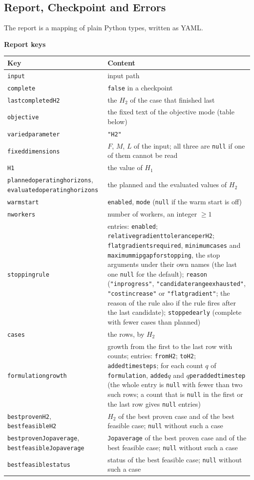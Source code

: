 \documentclass[11pt,a4paper]{article}
\makeatletter
\theoremstyle{plain}
\theoremstyle{definition}
\newcommand{\blockhead}[1]{\par\noindent\textbf{#1}\par\nobreak}
\renewcommand{\_}{\textunderscore\allowbreak{}}
\providecommand{\rejrow}[2]{{\raggedright #1\par} & {\raggedright #2\par} \\}
\providecommand{\tabstart}[2]{\begingroup\small\begin{longtable}{@{}#1@{}}\toprule #2 \\ \midrule \endhead}
\providecommand{\tabend}{\bottomrule\end{longtable}\endgroup}
\makeatother
\begin{document}
\subsection{Report, Checkpoint and Errors}
\label{sec:sweep_report}

The report is a mapping of plain Python types, written as YAML.

\blockhead{Report keys}
\tabstart{p{5.2cm}p{9.8cm}}{Key & Content}
\rejrow{\texttt{input}}{input path}
\rejrow{\texttt{complete}}{\texttt{false} in a checkpoint}
\rejrow{\texttt{last\_completed\_H2}}{the $H_2$ of the case that finished last}
\rejrow{\texttt{objective}}{the fixed text of the objective mode (table below)}
\rejrow{\texttt{varied\_parameter}}{\texttt{"H2"}}
\rejrow{\texttt{fixed\_dimensions}}{$F$, $M$, $L$ of the input; all three are \texttt{null} if one of them cannot be read}
\rejrow{\texttt{H1}}{the value of $H_1$}
\rejrow{\texttt{planned\_operating\_horizons}, \texttt{evaluated\_operating\_horizons}}{the planned and the evaluated values of $H_2$}
\rejrow{\texttt{warm\_start}}{\texttt{enabled}, \texttt{mode} (\texttt{null} if the warm start is off)}
\rejrow{\texttt{n\_workers}}{number of workers, an integer $\ge 1$}
\rejrow{\texttt{stopping\_rule}}{entries: \texttt{enabled}; \texttt{relative\_gradient\_tolerance\_per\_H2}; \texttt{flat\_gradients\_required}, \texttt{minimum\_cases} and \texttt{maximum\_mip\_gap\_for\_stopping}, the stop arguments under their own names (the last one \texttt{null} for the default); \texttt{reason} (\texttt{"in\_progress"}, \texttt{"candidate\_range\_exhausted"}, \texttt{"cost\_increase"} or \texttt{"flat\_gradient"}; the reason of the rule also if the rule fires after the last candidate); \texttt{stopped\_early} (complete with fewer cases than planned)}
\rejrow{\texttt{cases}}{the rows, by $H_2$}
\rejrow{\texttt{formulation\_growth}}{growth from the first to the last row with counts; entries: \texttt{from\_H2}; \texttt{to\_H2}; \texttt{added\_time\_steps}; for each count $q$ of \texttt{formulation}, \texttt{added\_}$q$ and $q$\texttt{\_per\_added\_time\_step} (the whole entry is \texttt{null} with fewer than two such rows; a count that is \texttt{null} in the first or the last row gives \texttt{null} entries)}
\rejrow{\texttt{best\_proven\_H2}, \texttt{best\_feasible\_H2}}{$H_2$ of the best proven case and of the best feasible case; \texttt{null} without such a case}
\rejrow{\texttt{best\_proven\_J\_op\_average}, \texttt{best\_feasible\_J\_op\_average}}{\texttt{J\_op\_average} of the best proven case and of the best feasible case; \texttt{null} without such a case}
\rejrow{\texttt{best\_feasible\_status}}{status of the best feasible case; \texttt{null} without such a case}
\tabend
\end{document}
